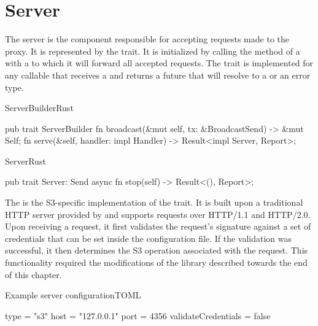\section{Server}

The server is the component responsible for accepting requests made to the proxy. It is represented by the  trait. 
It is initialized by calling the  method of a  with a  to which it will forward all accepted requests. The  trait is implemented for any callable that receives a  and returns a future that will resolve to a  or an error type.

\begin{multicols}{2}
	\begin{codeblock}{ServerBuilder}{Rust}
		\begin{rustcode}
			pub trait ServerBuilder {
				fn broadcast(&mut self, tx: &BroadcastSend) -> &mut Self;
				fn serve(&self, handler: impl Handler) -> Result<impl Server, Report>;
			}
		\end{rustcode}
	\end{codeblock}

	\begin{codeblock}{Server}{Rust}
		\begin{rustcode}
			pub trait Server: Send {
				async fn stop(self) -> Result<(), Report>;
			}
		\end{rustcode}
	\end{codeblock}
\end{multicols}

The  is the S3-specific implementation of the  trait. It is built upon a traditional HTTP server provided by  and supports requests over HTTP/1.1 and HTTP/2.0. Upon receiving a request, it first validates the request's signature against a set of credentials that can be set inside the configuration file. If the validation was successful, it then determines the S3 operation associated with the request. This functionality required the modifications of the  library described towards the end of this chapter.

\begin{codeblock}{Example server configuration}{TOML}
	\begin{javacode}
		[server]
		type = "s3"
		host = "127.0.0.1"
		port = 4356
		validateCredentials = false
	\end{javacode}
\end{codeblock}

